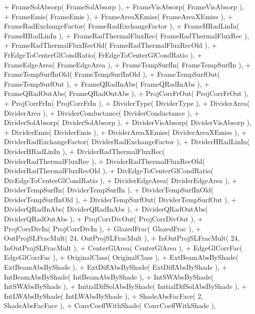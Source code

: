 \begin{DoxyCode}
+           FrameSolAbsorp( FrameSolAbsorp ),
+           FrameVisAbsorp( FrameVisAbsorp ),
+           FrameEmis( FrameEmis ),
+           FrameAreaXEmiss( FrameAreaXEmiss ),
+           FrameRadExchangeFactor( FrameRadExchangeFactor ),
+           FrameHRadLinIn( FrameHRadLinIn ),
+           FrameRadThermalFluxRec( FrameRadThermalFluxRec ),
+           FrameRadThermalFluxRecOld( FrameRadThermalFluxRecOld ),
+           FrEdgeToCenterGlCondRatio( FrEdgeToCenterGlCondRatio ),
+           FrameEdgeArea( FrameEdgeArea ),
+           FrameTempSurfIn( FrameTempSurfIn ),
+           FrameTempSurfInOld( FrameTempSurfInOld ),
+           FrameTempSurfOut( FrameTempSurfOut ),
+           FrameQRadInAbs( FrameQRadInAbs ),
+           FrameQRadOutAbs( FrameQRadOutAbs ),
+           ProjCorrFrOut( ProjCorrFrOut ),
+           ProjCorrFrIn( ProjCorrFrIn ),
+           DividerType( DividerType ),
+           DividerArea( DividerArea ),
+           DividerConductance( DividerConductance ),
+           DividerSolAbsorp( DividerSolAbsorp ),
+           DividerVisAbsorp( DividerVisAbsorp ),
+           DividerEmis( DividerEmis ),
+           DividerAreaXEmiss( DividerAreaXEmiss ),
+           DividerRadExchangeFactor( DividerRadExchangeFactor ),
+           DividerHRadLinIn( DividerHRadLinIn ),
+           DividerRadThermalFluxRec( DividerRadThermalFluxRec ),
+           DividerRadThermalFluxRecOld( DividerRadThermalFluxRecOld ),
+           DivEdgeToCenterGlCondRatio( DivEdgeToCenterGlCondRatio ),
+           DividerEdgeArea( DividerEdgeArea ),
+           DividerTempSurfIn( DividerTempSurfIn ),
+           DividerTempSurfInOld( DividerTempSurfInOld ),
+           DividerTempSurfOut( DividerTempSurfOut ),
+           DividerQRadInAbs( DividerQRadInAbs ),
+           DividerQRadOutAbs( DividerQRadOutAbs ),
+           ProjCorrDivOut( ProjCorrDivOut ),
+           ProjCorrDivIn( ProjCorrDivIn ),
+           GlazedFrac( GlazedFrac ),
+           OutProjSLFracMult( 24, OutProjSLFracMult ),
+           InOutProjSLFracMult( 24, InOutProjSLFracMult ),
+           CenterGlArea( CenterGlArea ),
+           EdgeGlCorrFac( EdgeGlCorrFac ),
+           OriginalClass( OriginalClass ),
+           ExtBeamAbsByShade( ExtBeamAbsByShade ),
+           ExtDiffAbsByShade( ExtDiffAbsByShade ),
+           IntBeamAbsByShade( IntBeamAbsByShade ),
+           IntSWAbsByShade( IntSWAbsByShade ),
+           InitialDifSolAbsByShade( InitialDifSolAbsByShade ),
+           IntLWAbsByShade( IntLWAbsByShade ),
+           ShadeAbsFacFace( 2, ShadeAbsFacFace ),
+           ConvCoeffWithShade( ConvCoeffWithShade ),

\end{DoxyCode}
